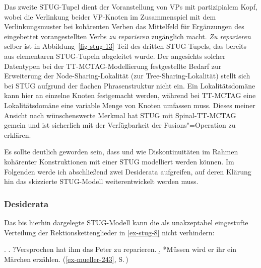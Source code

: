 Das zweite STUG-Tupel dient der Voranstellung von VPs mit partizipialem Kopf, wobei die Verlinkung beider VP-Knoten im Zusammenspiel mit dem Verlinkungsmuster bei kohärenten Verben das Mittelfeld für Ergänzungen des eingebettet vorangestellten Verbs {\it zu reparieren} zugänglich macht. {\it Zu reparieren} selber ist in Abbildung~\ref{fig-stug-13} Teil des dritten STUG-Tupels, das bereits aus elementaren STUG-Tupeln abgeleitet wurde. Der angesichts solcher Datentypen bei der TT-MCTAG-Modellierung festgestellte Bedarf zur Erweiterung der Node-Sharing-Lokalität (zur Tree-Sharing-Lokalität) stellt sich bei STUG aufgrund der flachen Phrasenstruktur nicht ein. Ein Lokalitätsdomäne kann hier an einzelne Knoten festgemacht werden, während bei TT-MCTAG eine Lokalitätsdomäne eine variable Menge von Knoten umfassen muss. Dieses meiner Ansicht nach wünschenswerte Merkmal hat STUG mit Spinal-TT-MCTAG gemein und ist sicherlich mit der Verfügbarkeit der Fusions"=Operation zu erklären.%

Es sollte deutlich geworden sein, dass und wie Diskontinuitäten im Rahmen kohärenter Konstruktionen mit einer STUG modelliert werden können. Im Folgenden werde ich abschlie\ss end zwei Desiderata aufgreifen, auf deren Klärung hin das skizzierte STUG-Modell weiterentwickelt werden muss.

\subsubsection*{Desiderata}

Das bis hierhin dargelegte STUG-Modell kann die als unakzeptabel eingestufte Verteilung der Rektionskettenglieder in \ref{ex-stug-8} nicht verhindern:

\ex. \label{ex-stug-8}
\a. ?Versprochen hat ihm das Peter zu reparieren.\label{ex-stug-8-a}
\b. *Müssen wird er ihr ein Märchen erzählen. \hfill (\ref{ex-mueller-243}, S.\,\pageref{ex-mueller-243})\label{ex-stug-8-b}

